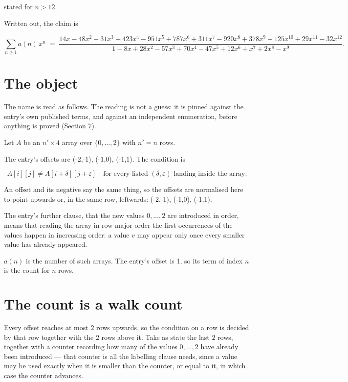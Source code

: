 \documentclass[11pt]{article}
\theoremstyle{definition}
\begin{document}
stated for $n > 12$.

Written out, the claim is

\[\sum_{n \ge 1} a(n)\,x^n \;=\; \frac{14x - 48x^{2} - 31x^{3} + 423x^{4} - 951x^{5} + 787x^{6} + 311x^{7} - 920x^{8} + 378x^{9} + 125x^{10} + 29x^{11} - 32x^{12}}{1 - 8x + 28x^{2} - 57x^{3} + 70x^{4} - 47x^{5} + 12x^{6} + x^{7} + 2x^{8} - x^{9}}.\]

\section{The object}

The name is read as follows. The reading is not a guess: it is pinned against the entry's own published terms, and against an independent enumeration, before anything is proved (Section 7).

Let $A$ be an $n' \times 4$ array over $\{0,\dots,2\}$ with $n' = n$ rows.

The entry's offsets are (-2,-1), (-1,0), (-1,1). The condition is

\[A[i][j] \ne A[i{+}\delta][j{+}\varepsilon]\quad\text{for every listed }(\delta,\varepsilon)\text{ landing inside the array.}\]

An offset and its negative say the same thing, so the offsets are normalised here to point upwards or, in the same row, leftwards: (-2,-1), (-1,0), (-1,1).

The entry's further clause, that the new values $0,\dots,2$ are introduced in order, means that reading the array in row-major order the first occurrences of the values happen in increasing order: a value $v$ may appear only once every smaller value has already appeared.

$a(n)$ is the number of such arrays. The entry's offset is 1, so its term of index $n$ is the count for $n$ rows.

\section{The count is a walk count}

Every offset reaches at most $2$ rows upwards, so the condition on a row is decided by that row together with the $2$ rows above it. Take as state the last $2$ rows, together with a counter recording how many of the values $0,\dots,2$ have already been introduced --- that counter is all the labelling clause needs, since a value may be used exactly when it is smaller than the counter, or equal to it, in which case the counter advances.
\end{document}

